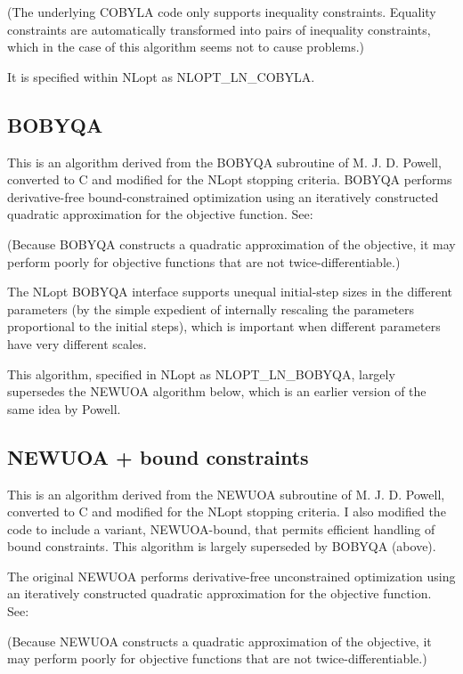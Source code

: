(The underlying COBYLA code only supports inequality constraints. Equality constraints are automatically transformed into pairs of inequality constraints, which in the case of this algorithm seems not to cause problems.) 

It is specified within NLopt as NLOPT\_LN\_COBYLA. 





\subsection{BOBYQA}
This is an algorithm derived from the BOBYQA subroutine of M. J. D. Powell, converted to C and modified for the NLopt stopping criteria. BOBYQA performs derivative-free bound-constrained optimization using an iteratively constructed quadratic approximation for the objective function. See: \cite{Powell2009}


(Because BOBYQA constructs a quadratic approximation of the objective, it may perform poorly for objective functions that are not twice-differentiable.) 

The NLopt BOBYQA interface supports unequal initial-step sizes in the different parameters (by the simple expedient of internally rescaling the parameters proportional to the initial steps), which is important when different parameters have very different scales. 

This algorithm, specified in NLopt as NLOPT\_LN\_BOBYQA, largely supersedes the NEWUOA algorithm below, which is an earlier version of the same idea by Powell. 




\subsection{NEWUOA + bound constraints}
This is an algorithm derived from the NEWUOA subroutine of M. J. D. Powell, converted to C and modified for the NLopt stopping criteria. I also modified the code to include a variant, NEWUOA-bound, that permits efficient handling of bound constraints. This algorithm is largely superseded by BOBYQA (above). 

The original NEWUOA performs derivative-free unconstrained optimization using an iteratively constructed quadratic approximation for the objective function. See: \cite{Powell_2004}



(Because NEWUOA constructs a quadratic approximation of the objective, it may perform poorly for objective functions that are not twice-differentiable.) 

